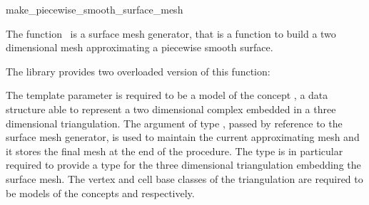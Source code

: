 

\begin{ccRefFunction}{make_piecewise_smooth_surface_mesh} 



\ccDefinition
  
The function \ccRefName\ is a surface mesh generator,
that is a function to build a two dimensional mesh 
approximating a piecewise smooth surface.

The library provides two overloaded version 
of this function:








\ccParameters
The template parameter  
is required to be a model of the concept
,
a data structure able to represent a two dimensional
complex  embedded in a three dimensional triangulation.
The argument  of type ,  passed by reference
to the surface mesh generator, 
is used to maintain  the current approximating mesh and it stores
the final mesh at the end of the procedure.
The type  is in particular required to
provide a type 
for the three dimensional triangulation
embedding the surface mesh.
The vertex and cell base classes of the triangulation
 are required
to be  models  of the concepts 
 and 
 respectively.



\end{ccRefFunction}
